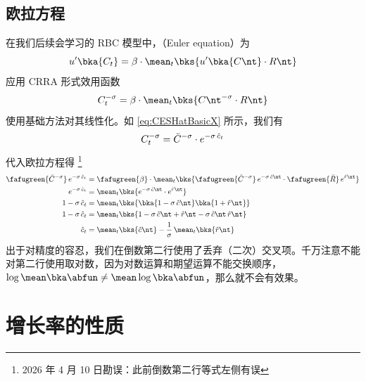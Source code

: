 \subsection{欧拉方程}\label{subsec:exEuler}

在我们后续会学习的 RBC 模型中，（Euler equation）为
\begin{equation}
    u'\bka{C_t}=\beta\cdot\mean_t\bks{u'\bka{C\nt}\cdot R\nt}
\end{equation}
应用 CRRA 形式效用函数
\begin{equation}
    C_t^{-\sigma}=\beta\cdot\mean_t\bks{C\nt^{-\sigma}\cdot R\nt}
\end{equation}
使用基础方法对其线性化。如 \ref{eq:CESHatBasicX} 所示，我们有
\begin{equation}
    C_t^{-\sigma}=\bar C^{-\sigma}\cdot e^{-\sigma\,\hat c_t}\notag
\end{equation}
代入欧拉方程得 \footnote{2026 年 4 月 10 日勘误：此前倒数第二行等式左侧有误}
\begin{align}
    \fafugreen{\bar C^{-\sigma}}\,e^{-\sigma\,\hat c_t}&=\fafugreen{\beta}\cdot\mean_t\bks{\fafugreen{\bar C^{-\sigma}}\,e^{-\sigma\,\hat c\nt}\cdot \fafugreen{\bar R}\,e^{\hat r\nt}}\notag\\
    e^{-\sigma\,\hat c_t}&=\mean_t\bks{e^{-\sigma\,\hat c\nt}\cdot e^{\hat r\nt}}\notag\\
    1-\sigma\,\hat c_t&=\mean_t\bks{\bka{1-\sigma\,\hat c\nt}\bka{1+\hat r\nt}}\notag\\
    1-\sigma\,\hat c_t&=\mean_t\bks{1-\sigma\,\hat c\nt+\hat r\nt-\sigma\,\hat c\nt\,\hat r\nt}\notag\\
    \hat c_t&=\mean_t\bks{\hat c\nt}-\dfrac1\sigma\,\mean_t\bks{\hat r\nt}
\end{align}
出于对精度的容忍，我们在倒数第二行使用了丢弃（二次）交叉项。千万注意不能对第二行使用取对数，因为对数运算和期望运算不能交换顺序，\(\log\mean\bka\abfun\ne\mean\log\bka\abfun\)，那么就不会有效果。

\BeginChapterAppendix

\section{增长率的性质}\label{sec:GrowRateProp}

